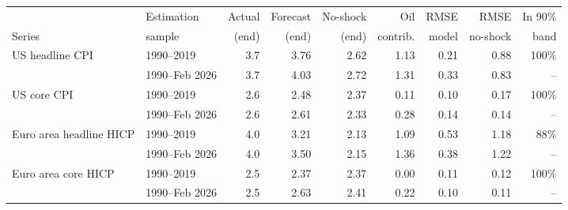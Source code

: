 \begin{tabular}{llrrrrrrr}
\toprule
 & Estimation & Actual & Forecast & No-shock & Oil & RMSE & RMSE & In 90\%\\
Series & sample & (end) & (end) & (end) & contrib. & model & no-shock & band\\
\midrule
US headline CPI & 1990--2019 & 3.7 & 3.76 & 2.62 & 1.13 & 0.21 & 0.88 & 100\%\\
 & 1990--Feb 2026 & 3.7 & 4.03 & 2.72 & 1.31 & 0.33 & 0.83 & --\\
\addlinespace
US core CPI & 1990--2019 & 2.6 & 2.48 & 2.37 & 0.11 & 0.10 & 0.17 & 100\%\\
 & 1990--Feb 2026 & 2.6 & 2.61 & 2.33 & 0.28 & 0.14 & 0.14 & --\\
\addlinespace
Euro area headline HICP & 1990--2019 & 4.0 & 3.21 & 2.13 & 1.09 & 0.53 & 1.18 & 88\%\\
 & 1990--Feb 2026 & 4.0 & 3.50 & 2.15 & 1.36 & 0.38 & 1.22 & --\\
\addlinespace
Euro area core HICP & 1990--2019 & 2.5 & 2.37 & 2.37 & 0.00 & 0.11 & 0.12 & 100\%\\
 & 1990--Feb 2026 & 2.5 & 2.63 & 2.41 & 0.22 & 0.10 & 0.11 & --\\
\bottomrule
\end{tabular}